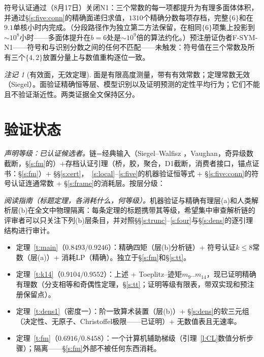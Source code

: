 \documentclass[11pt]{article}
\numberwithin{equation}{section}
\theoremstyle{definition}
\theoremstyle{remark}
\newtheorem{remark}[theorem]{注记}
\begin{document}
符号认证通过（8月17日）关闭N1：三个常数的每一项都提升为有理多面体体积，并通过\S\ref{s:five:conn}的精确面递归求值，$1310$个精确分数每项存档，完整$\{6\}$和在$9.1$单核小时内完成。（分段路径作为独立第二方法保留，在相同$\{6\}$项集上投影到$\sim10^{8}$小时——多面体提升在$b=6$处是$\sim10^{9}$倍的算法约化。）预注册证伪者F-SYM-N1——符号和与识别分数之间的任何不匹配——未触发：符号值在三个常数及所有三个$\{4,2\}$放置分量上与数值重构逐位一致。

\begin{remark}[有效面，无效定理]
面是有限高度测量，带有有效常数；定理常数无效（Siegel）。面验证精确恒等层、模型识别以及证明预测的定性平均行为；它们不能且不验证渐近性。两类证据全文保持区分。
\end{remark}

\section{验证状态}\label{s:verif}

\emph{声明等级：已认证候选者。}链=经典输入（Siegel--Walfisz \cite{Dav,IK}，Vaughan，奇异级数截断，\S\ref{s:fm}的\cite{MRT}）+存档认证引理（桥，胶，聚合，D1截断，消费者接口，锚点证书：\S\ref{s:fm}）+ \S\S\ref{s:cert}，~\ref{s:local}--\ref{s:five}的机器验证恒等式 + \S\ref{s:five:conn}的符号认证连通常数 + \S\ref{s:frame}的消耗层。按层分级：

\medskip
\noindent\emph{阅读指南（标题定理，各消耗什么，何等级）。}机器验证与精确有理层(a)和人类解析层(b)在全文中物理隔离：每条定理的标题携带其等级，希望集中审查解析链的评审者可以只关注下列(b)层条目，并对照\S\S\ref{s:trunc}--\ref{s:four}与\S\ref{s:dens}的逐引理结构进行审计。
\begin{itemize}
\item 定理~\ref{t:main}（$0.8493/0.9246$）：精确四矩（层(b)分析链）+ 符号认证$k\le8$常数（层(a)）+ 消耗LP（精确）。独立于\S\ref{s:fm}和\S\ref{s:tt}。
\item 定理~\ref{t:k14}（$0.9104/0.9552$）：上述 + Toeplitz--迹矩$m_9..m_{14}$，现已证明精确有理数（分支相等和奇偶性定理，\S\ref{s:tt}；证明等级有限表，带双实现和预注册保留点）。
\item 定理~\ref{t:dens1}（密度一）：阶一致算术装置（层(b)）+ \S\ref{s:dens}的软三元组（决定性、无原子、Christoffel极限——已证明）+ 无数值表且无速率。
\item 定理~\ref{t:fm}（$0.6916/0.8458$）：一个计算机辅助梯级（引理~\ref{l:CL}数值分析步骤）；隔离——\S\ref{s:fm}外部不被任何东西消耗。
\end{itemize}
\medskip
\end{document}
